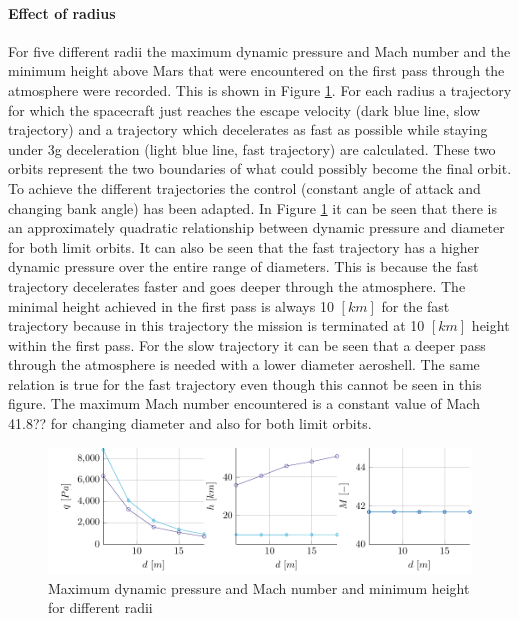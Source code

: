 \paragraph{Effect of radius}
For five different radii the maximum dynamic pressure and Mach number and the minimum height above Mars that were encountered on the first pass through the atmosphere were recorded. This is shown in Figure \ref{fig:radius}. For each radius a trajectory for which the spacecraft just reaches the escape velocity (dark blue line, slow trajectory) and a trajectory which decelerates as fast as possible while staying under 3g deceleration (light blue line, fast trajectory) are calculated. These two orbits represent the two boundaries of what could possibly become the final orbit. To achieve the different trajectories the control (constant angle of attack and changing bank angle) has been adapted. In Figure \ref{fig:radius} it can be seen that there is an approximately quadratic relationship between dynamic pressure and diameter for both limit orbits. It can also be seen that the fast trajectory has a higher dynamic pressure over the entire range of diameters. This is because the fast trajectory decelerates faster and goes deeper through the atmosphere. The minimal height achieved in the first pass is always 10 $\left[km\right]$ for the fast trajectory because in this trajectory the mission is terminated at 10 $\left[km\right]$ height within the first pass. For the slow trajectory it can be seen that a deeper pass through the atmosphere is needed with a lower diameter aeroshell. The same relation is true for the fast trajectory even though this cannot be seen in this figure. The maximum Mach number encountered is a constant value of Mach 41.8?? for changing diameter and also for both limit orbits.

\begin{figure}[h]
	\centering
	\includegraphics[width=\textwidth]{./Figure/orbit/radius_param.pdf}
	\caption{Maximum dynamic pressure and Mach number and minimum height for different radii}
	\label{fig:radius}
\end{figure}

